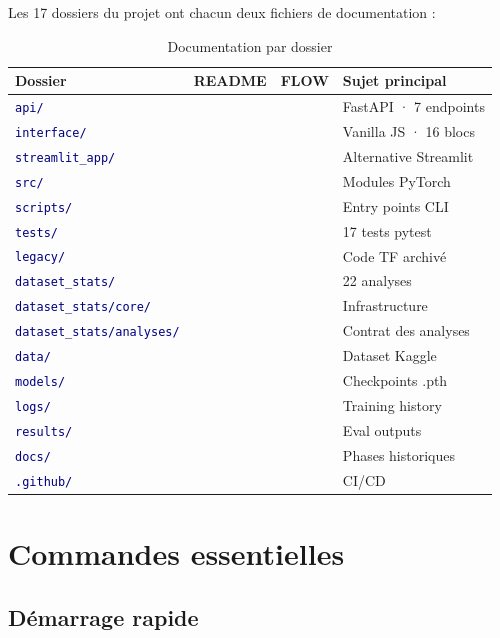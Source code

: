 \documentclass[11pt,a4paper,oneside]{report}
\newcommand{\cmark}{\ding{51}}
\newcommand{\code}[1]{\texttt{\textcolor{navy}{#1}}}
\newcommand{\gn}[1]{\textcolor{accentgreen}{#1}}
\begin{document}
Les 17 dossiers du projet ont chacun deux fichiers de documentation :

\begin{table}[!htbp]
\centering
\caption{Documentation par dossier}
\small
\begin{tabular}{|l|c|c|l|}
\hline
\textbf{Dossier} & \textbf{README} & \textbf{FLOW} & \textbf{Sujet principal} \\
\hline
\code{api/} & \gn{\cmark} & \gn{\cmark} & FastAPI · 7 endpoints \\
\code{interface/} & \gn{\cmark} & \gn{\cmark} & Vanilla JS · 16 blocs \\
\code{streamlit\_app/} & \gn{\cmark} & \gn{\cmark} & Alternative Streamlit \\
\code{src/} & \gn{\cmark} & \gn{\cmark} & Modules PyTorch \\
\code{scripts/} & \gn{\cmark} & \gn{\cmark} & Entry points CLI \\
\code{tests/} & \gn{\cmark} & \gn{\cmark} & 17 tests pytest \\
\code{legacy/} & \gn{\cmark} & \gn{\cmark} & Code TF archivé \\
\code{dataset\_stats/} & \gn{\cmark} & \gn{\cmark} & 22 analyses \\
\code{dataset\_stats/core/} & \gn{\cmark} & \gn{\cmark} & Infrastructure \\
\code{dataset\_stats/analyses/} & \gn{\cmark} & \gn{\cmark} & Contrat des analyses \\
\code{data/} & \gn{\cmark} & \gn{\cmark} & Dataset Kaggle \\
\code{models/} & \gn{\cmark} & \gn{\cmark} & Checkpoints .pth \\
\code{logs/} & \gn{\cmark} & \gn{\cmark} & Training history \\
\code{results/} & \gn{\cmark} & \gn{\cmark} & Eval outputs \\
\code{docs/} & \gn{\cmark} & \gn{\cmark} & Phases historiques \\
\code{.github/} & \gn{\cmark} & \gn{\cmark} & CI/CD \\
\hline
\end{tabular}
\end{table}

\section{Commandes essentielles}

\subsection{Démarrage rapide}
\end{document}
